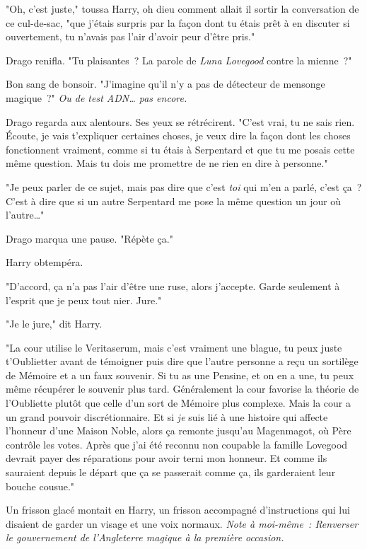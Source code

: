 "Oh, c'est juste," toussa Harry, oh dieu comment allait il sortir la conversation de ce cul-de-sac, "que j'étais surpris par la façon dont tu étais prêt à en discuter si ouvertement, tu n'avais pas l'air d'avoir peur d'être pris."

Drago renifla. "Tu plaisantes~? La parole de \emph{Luna Lovegood} contre la mienne~?"

Bon sang de bonsoir. "J'imagine qu'il n'y a pas de détecteur de mensonge magique~?" \emph{Ou de test ADN… pas encore.}

Drago regarda aux alentours. Ses yeux se rétrécirent. "C'est vrai, tu ne sais rien. Écoute, je vais t'expliquer certaines choses, je veux dire la façon dont les choses fonctionnent vraiment, comme si tu étais à Serpentard et que tu me posais cette même question. Mais tu dois me promettre de ne rien en dire à personne."

"Je peux parler de ce sujet, mais pas dire que c'est \emph{toi} qui m'en a parlé, c'est ça~? C'est à dire que si un autre Serpentard me pose la même question un jour où l'autre…"

Drago marqua une pause. "Répète ça."

Harry obtempéra.

"D'accord, ça n'a pas l'air d'être une ruse, alors j'accepte. Garde seulement à l'esprit que je peux tout nier. Jure."

"Je le jure," dit Harry.

"La cour utilise le Veritaserum, mais c'est vraiment une blague, tu peux juste t'Oublietter avant de témoigner puis dire que l'autre personne a reçu un sortilège de Mémoire et a un faux souvenir. Si tu as une Pensine, et on en a une, tu peux même récupérer le souvenir plus tard. Généralement la cour favorise la théorie de l'Oubliette plutôt que celle d'un sort de Mémoire plus complexe. Mais la cour a un grand pouvoir discrétionnaire. Et si \emph{je} suis lié à une histoire qui affecte l'honneur d'une Maison Noble, alors ça remonte jusqu'au Magenmagot, où Père contrôle les votes. Après que j'ai été reconnu non coupable la famille Lovegood devrait payer des réparations pour avoir terni mon honneur. Et comme ils sauraient depuis le départ que ça se passerait comme ça, ils garderaient leur bouche cousue."

Un frisson glacé montait en Harry, un frisson accompagné d'instructions qui lui disaient de garder un visage et une voix normaux. \emph{Note à moi-même~: Renverser le gouvernement de l'Angleterre magique à la première occasion.}

